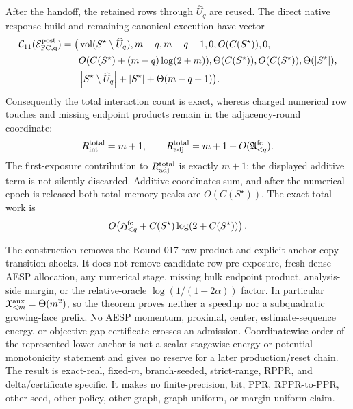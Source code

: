 \begin{theorem}
After the handoff, the retained rows through $\widehat U_q$ are reused.  The
direct native response build and remaining canonical execution have vector
\begin{equation}
 \begin{aligned}
 \mathcal C_{11}(\mathcal E_{\rm FC,q}^{\rm post})=\bigl(&
 \operatorname{vol}(S^\star\setminus\widehat U_q),m-q,m-q+1,0,
 O(C(S^\star)),0,\\
 &O(C(S^\star)+(m-q)\log(2+m)),
 \Theta(C(S^\star)),O(C(S^\star)),
 \Theta(\left\lvert S^\star \right\rvert),\\
 &\left\lvert S^\star\setminus\widehat U_q \right\rvert
   +\left\lvert S^\star \right\rvert+\Theta(m-q+1)\bigr).
 \end{aligned}
 \label{eq:branch-caterpillar-incremental-face-post-eleven-vector}
\end{equation}
Consequently the total interaction count is exact, whereas charged numerical
row touches and missing endpoint products remain in the adjacency-round
coordinate:
\begin{equation}
 R_{\rm int}^{\rm total}=m+1,
 \qquad
 R_{\rm adj}^{\rm total}
 =m+1+O(\mathfrak A_{<q}^{\rm fc}).
 \label{eq:branch-caterpillar-incremental-face-total-rounds}
\end{equation}
The first-exposure contribution to $R_{\rm adj}^{\rm total}$ is exactly
$m+1$; the displayed additive term is not silently discarded.  Additive
coordinates sum, and after the numerical epoch is released both total memory
peaks are $O(C(S^\star))$.  The exact total work is
\begin{equation}
 O\!\left(\mathfrak H_{<q}^{\rm fc}
       +C(S^\star)\log(2+C(S^\star))\right).
 \label{eq:branch-caterpillar-incremental-face-total-work}
\end{equation}

The construction removes the Round-017 raw-product and explicit-anchor-copy
transition shocks.  It does not remove candidate-row pre-exposure, fresh
dense AESP allocation, any numerical stage, missing bulk endpoint product,
analysis-side margin, or the relative-oracle
$\log(1/(1-2\alpha))$ factor.  In particular
$\mathfrak X_{<m}^{\rm aux}=\Theta(m^2)$, so the theorem proves neither a
speedup nor a subquadratic growing-face prefix.  No AESP momentum, proximal,
center, estimate-sequence energy, or objective-gap certificate crosses an
admission.  Coordinatewise order of the represented lower anchor is not a
scalar stagewise-energy or potential-monotonicity statement and gives no
reserve for a later production/reset chain.  The result is exact-real,
fixed-$m$, branch-seeded, strict-range,
RPPR, and delta/certificate specific.  It makes no finite-precision, bit,
PPR, RPPR-to-PPR, other-seed, other-policy, other-graph, graph-uniform, or
margin-uniform claim.
\end{theorem}

